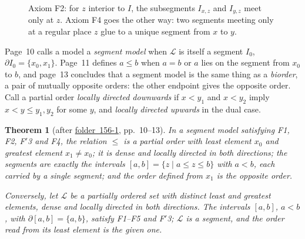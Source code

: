 \documentclass[11pt,a4paper]{amsart}
\newtheorem{theorem}{Theorem}[section]
\theoremstyle{definition}
\theoremstyle{remark}
\newcommand{\cL}{\mathcal L}
\newcommand{\fac}[1]{\href{https://grothendieck.umontpellier.fr/#1.pdf}{folder~#1}}
\begin{document}
\begin{figure}[ht]
\centering
{}
\caption{Axiom F2: for $z$ interior to $I$, the subsegments $I_{x,z}$ and $I_{y,z}$ meet only at $z$. Axiom F4 goes the other way: two segments meeting only at a regular place $z$ glue to a unique segment from $x$ to $y$.}\label{fig:F2}
\end{figure}

Page~10 calls a model a \emph{segment model} when $\cL$ is itself a segment $I_0$, $\partial I_0 = \{x_0, x_1\}$. Page~11 defines $a \le b$ when $a = b$ or $a$ lies on the segment from $x_0$ to $b$, and page~13 concludes that a segment model is the same thing as a \emph{biorder}, a pair of mutually opposite orders: the other endpoint gives the opposite order. Call a partial order \emph{locally directed downwards} if $x < y_1$ and $x < y_2$ imply $x < y \le y_1, y_2$ for some $y$, and \emph{locally directed upwards} in the dual case.

\begin{theorem}[after \fac{156-1}, pp.~10--13]\label{thm:biorder}
In a segment model satisfying F1, F2, F$'$3 and F4, the relation $\le$ is a partial order with least element $x_0$ and greatest element $x_1 \ne x_0$; it is dense and locally directed in both directions; the segments are exactly the intervals $[a, b] = \{z \mid a \le z \le b\}$ with $a < b$, each carried by a single segment; and the order defined from $x_1$ is the opposite order.

Conversely, let $\cL$ be a partially ordered set with distinct least and greatest elements, dense and locally directed in both directions. The intervals $[a, b]$, $a < b$, with $\partial[a, b] = \{a, b\}$, satisfy F1--F5 and F$'$3; $\cL$ is a segment, and the order read from its least element is the given one.
\end{theorem}
\end{document}
